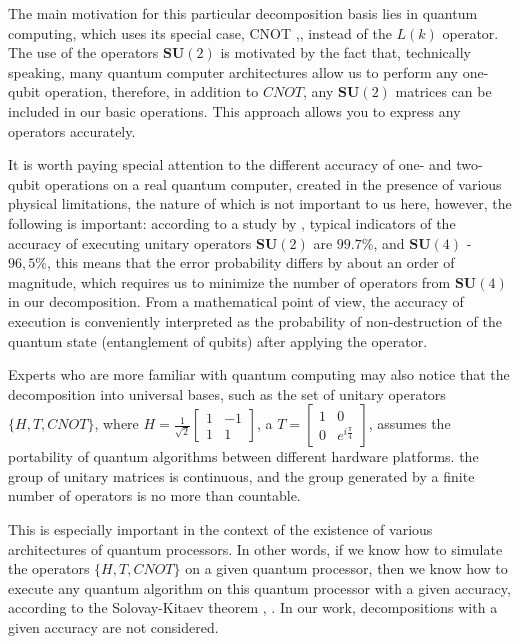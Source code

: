 \documentclass[a4paper, openany, 12pt]{article}
\theoremstyle{remark}
\theoremstyle{definition}
\begin{document}
The main motivation for this particular decomposition basis lies in quantum computing, which uses its special case, CNOT \cite{crooks2024},\cite{nch}, instead of the $L(k)$ operator. The use of the operators $\mathbf{SU}(2)$ is motivated by the fact that, technically speaking, many quantum computer architectures allow us to perform any one-qubit operation, therefore, in addition to $CNOT$, any $\mathbf{SU}(2)$ matrices can be included in our basic operations. This approach allows you to express any operators accurately.

It is worth paying special attention to the different accuracy of one- and two-qubit operations on a real quantum computer, created in the presence of various physical limitations, the nature of which is not important to us here, however, the following is important: according to a study by \cite{expcnotsign}, typical indicators of the accuracy of executing unitary operators $\mathbf{SU}(2)$ are $99.7\%$, and $\mathbf{SU}(4)$ - $96,5\%$, this means that the error probability differs by about an order of magnitude, which requires us to minimize the number of operators from $\mathbf{SU}(4)$ in our decomposition. From a mathematical point of view, the accuracy of execution is conveniently interpreted as the probability of non-destruction of the quantum state (entanglement of qubits) after applying the operator.

Experts who are more familiar with quantum computing may also notice that the decomposition into universal bases, such as the set of unitary operators $\{H,T, CNOT\}$, where $H =\frac{1}{\sqrt{2}}\begin{bmatrix}
    1&-1\\1&1
\end{bmatrix}$, a $T =\begin{bmatrix}
    1 &0\\0&e^{i\frac{\pi}{4}}
\end{bmatrix}$, assumes the portability of quantum algorithms between different hardware platforms.    the group of unitary matrices is continuous, and the group generated by a finite number of operators is no more than countable. 

This is especially important in the context of the existence of various architectures of quantum processors. In other words, if we know how to simulate the operators $\{H,T, CNOT\}$ on a given quantum processor, then we know how to execute any quantum algorithm on this quantum processor with a given accuracy, according to the Solovay-Kitaev theorem \cite{kitaev1997}, \cite{kitaev2002}. In our work, decompositions with a given accuracy are not considered.
\end{document}
